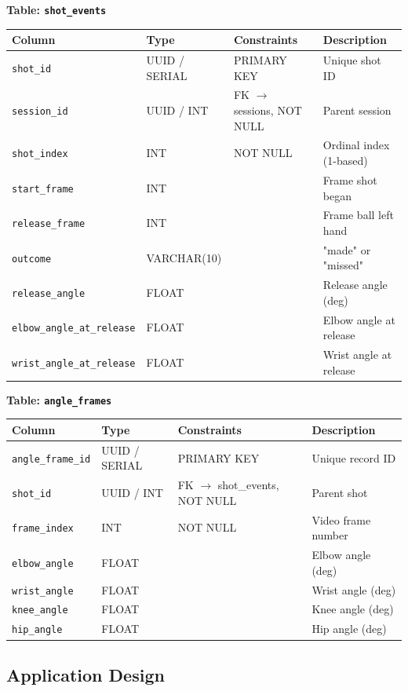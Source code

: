 ﻿\documentclass[11pt,a4paper]{article}
\begin{document}
\textbf{Table: \texttt{shot\_events}}

\begin{longtable}{|L{3.5cm}|L{3cm}|L{2.5cm}|L{5cm}|}
\hline
\textbf{Column} & \textbf{Type} & \textbf{Constraints} & \textbf{Description} \\ \hline
\texttt{shot\_id} & UUID / SERIAL & PRIMARY KEY & Unique shot ID \\ \hline
\texttt{session\_id} & UUID / INT & FK $\to$ sessions, NOT NULL & Parent session \\ \hline
\texttt{shot\_index} & INT & NOT NULL & Ordinal index (1-based) \\ \hline
\texttt{start\_frame} & INT & & Frame shot began \\ \hline
\texttt{release\_frame} & INT & & Frame ball left hand \\ \hline
\texttt{outcome} & VARCHAR(10) & & "made" or "missed" \\ \hline
\texttt{release\_angle} & FLOAT & & Release angle (deg) \\ \hline
\texttt{elbow\_angle\_at\_release} & FLOAT & & Elbow angle at release \\ \hline
\texttt{wrist\_angle\_at\_release} & FLOAT & & Wrist angle at release \\ \hline
\end{longtable}

\textbf{Table: \texttt{angle\_frames}}

\begin{longtable}{|L{3.2cm}|L{3cm}|L{2.8cm}|L{5cm}|}
\hline
\textbf{Column} & \textbf{Type} & \textbf{Constraints} & \textbf{Description} \\ \hline
\texttt{angle\_frame\_id} & UUID / SERIAL & PRIMARY KEY & Unique record ID \\ \hline
\texttt{shot\_id} & UUID / INT & FK $\to$ shot\_events, NOT NULL & Parent shot \\ \hline
\texttt{frame\_index} & INT & NOT NULL & Video frame number \\ \hline
\texttt{elbow\_angle} & FLOAT & & Elbow angle (deg) \\ \hline
\texttt{wrist\_angle} & FLOAT & & Wrist angle (deg) \\ \hline
\texttt{knee\_angle} & FLOAT & & Knee angle (deg) \\ \hline
\texttt{hip\_angle} & FLOAT & & Hip angle (deg) \\ \hline
\end{longtable}

\subsection{Application Design}
\end{document}
